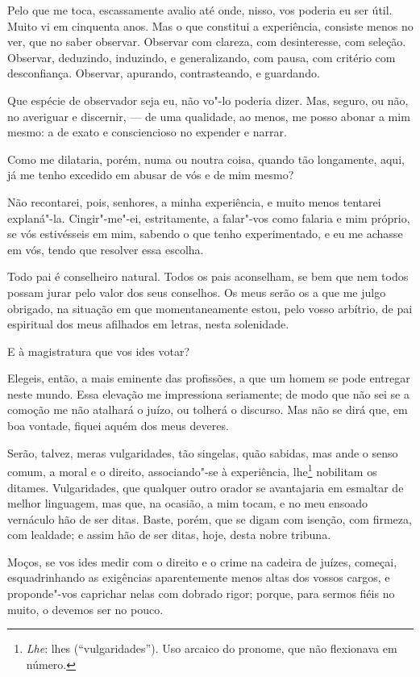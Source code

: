 Pelo que me toca, escassamente avalio até onde, nisso, vos poderia
eu ser útil. Muito vi em cinquenta anos. Mas o que constitui a
experiência, consiste menos no ver, que no saber observar. Observar com
clareza, com desinteresse, com seleção. Observar, deduzindo, induzindo,
e generalizando, com pausa, com critério com desconfiança. Observar,
apurando, contrasteando, e guardando.

Que espécie de observador seja eu, não vo"-lo poderia dizer. Mas,
seguro, ou não, no averiguar e discernir, --- de uma qualidade, ao menos,
me posso abonar a mim mesmo: a de exato e consciencioso no expender e narrar.

Como me dilataria, porém, numa ou noutra coisa, quando tão
longamente, aqui, já me tenho excedido em abusar de vós e de mim mesmo?

Não recontarei, pois, senhores, a minha experiência, e muito menos
tentarei explaná"-la. Cingir"-me"-ei, estritamente, a falar"-vos como
falaria e mim próprio, se vós estivésseis em mim, sabendo o que tenho
experimentado, e eu me achasse em vós, tendo que resolver essa escolha.

Todo pai é conselheiro natural. Todos os pais aconselham, se bem
que nem todos possam jurar pelo valor dos seus conselhos. Os meus serão
os a que me julgo obrigado, na situação em que momentaneamente estou,
pelo vosso arbítrio, de pai espiritual dos meus afilhados em letras,
nesta solenidade.

E à magistratura que vos ides votar?

Elegeis, então, a mais eminente das profissões, a que um homem se
pode entregar neste mundo. Essa elevação me impressiona seriamente; de
modo que não sei se a comoção me não atalhará o juízo, ou tolherá o
discurso. Mas não se dirá que, em boa vontade, fiquei aquém dos meus deveres.

Serão, talvez, meras vulgaridades, tão singelas, quão sabidas, mas
ande o senso comum, a moral e o direito, associando"-se à experiência,
lhe\footnote{\textit{Lhe}: lhes (“vulgaridades”). Uso arcaico do pronome, que não flexionava em número.}
nobilitam os ditames. Vulgaridades, que qualquer outro orador se
avantajaria em esmaltar de melhor linguagem, mas que, na ocasião, a mim
tocam, e no meu ensoado vernáculo hão de ser ditas. Baste, porém, que
se digam com isenção, com firmeza, com lealdade; e assim hão de ser
ditas, hoje, desta nobre tribuna.

Moços, se vos ides medir com o direito e o crime na cadeira de
juízes, começai, esquadrinhando as exigências aparentemente menos altas
dos vossos cargos, e proponde"-vos caprichar nelas com dobrado rigor;
porque, para sermos fiéis no muito, o devemos ser no pouco.

